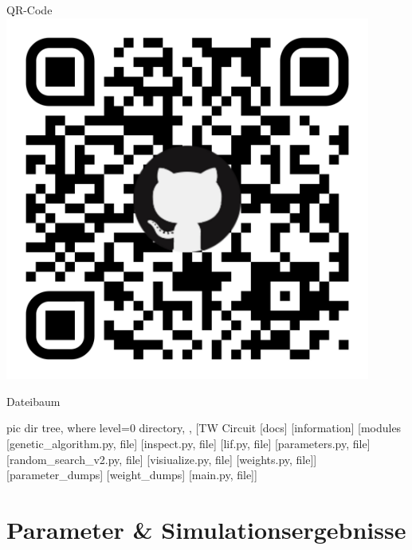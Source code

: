 \begin{minipage}[b]{0.38\textwidth}
	\begin{mybox}{QR-Code}
		\centering
		\includegraphics[width=0.9\textwidth]{figures/appendix/qr-code.pdf}
	\end{mybox}
	\begin{mybox}{Dateibaum}
		\vspace{0.1cm}
		\begin{forest}
			pic dir tree,
			where level=0{}{%
				directory,
			},
			[TW Circuit
			[docs]
			[information]
			[modules
			[genetic\_algorithm.py, file]
			[inspect.py, file]
			[lif.py, file]
			[parameters.py, file]
			[random\_search\_v2.py, file]
			[visiualize.py, file]
			[weights.py, file]]
			[parameter\_dumps]
			[weight\_dumps]
			[main.py, file]]
		\end{forest}
	\end{mybox}
\end{minipage}
%
\chapter{Parameter \& Simulationsergebnisse}
%
\label{app:parameter}

